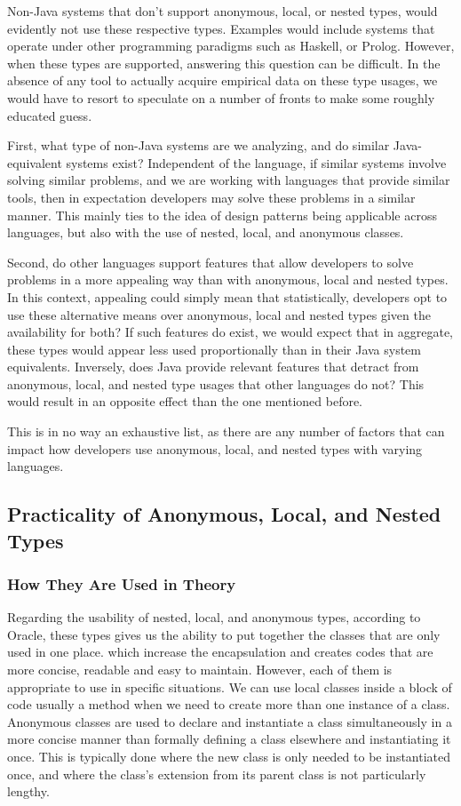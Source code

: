 \documentclass[12p]{article}
\begin{document}
Non-Java systems that don’t support anonymous, local, or nested types, would evidently not use these respective types. Examples would include systems that operate under other programming paradigms such as Haskell, or Prolog. However, when these types are supported, answering this question can be difficult. In the absence of any tool to actually acquire empirical data on these type usages, we would have to resort to speculate on a number of fronts to make some roughly educated guess.

First, what type of non-Java systems are we analyzing, and do similar Java-equivalent systems exist? Independent of the language, if similar systems involve solving similar problems, and we are working with languages that provide similar tools, then in expectation developers may solve these problems in a similar manner. This mainly ties to the idea of design patterns being applicable across languages, but also with the use of nested, local, and anonymous classes.

Second, do other languages support features that allow developers to solve problems in a more appealing way than with anonymous, local and nested types. In this context, appealing could simply mean that statistically, developers opt to use these alternative means over anonymous, local and nested types given the availability for both? If such features do exist, we would expect that in aggregate, these types would appear less used proportionally than in their Java system equivalents. Inversely, does Java provide relevant features that detract from anonymous, local, and nested type usages that other languages do not? This would result in an opposite effect than the one mentioned before.

This is in no way an exhaustive list, as there are any number of factors that can impact how developers use anonymous, local, and nested types with varying languages.

\subsection{Practicality of Anonymous, Local, and Nested Types}

\subsubsection{How They Are Used in Theory}

Regarding the usability of nested, local, and anonymous types, according to Oracle, these types gives us the ability to put together the classes that are only used in one place. which increase the encapsulation and creates codes that are more concise, readable and easy to maintain. However, each of them is appropriate to use in specific situations. We can use local classes inside a block of code usually a method when we need to create more than one instance of a class. Anonymous classes are used to declare and instantiate a class simultaneously in a more concise manner than formally defining a class elsewhere and instantiating it once. This is typically done where the new class is only needed to be instantiated once, and  where the class’s extension from its parent class is not particularly lengthy.
\end{document}
